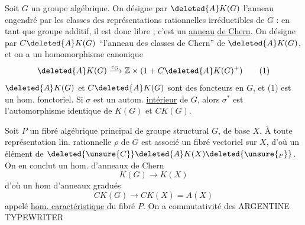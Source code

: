 Soit $G$ un groupe algébrique. On désigne par $\deleted{A}K(G)$
l'anneau  engendré par les classes des représentations
rationnelles irréductibles de $G$ : en tant que groupe
additif, il est donc libre ; c'est un \uline{anneau}
\uline{de Chern}. On désigne par $C\deleted{A}K(G)$ ``l'anneau
des classes de Chern'' de $\deleted{A}K(G)$,  
et on a un homomorphisme canonique
\[
\deleted{A}K(G)\xrightarrow{c_G}\mathbb Z\times(1+C\deleted{A}K(G)^+) \tag*{(1)}
\]
$\deleted{A}K(G)$ et $C\deleted{A}K(G)$ sont des foncteurs en $G$, et
(1) est un hom. fonctoriel. Si $\sigma$ est un
autom. \uline{intérieur} de $G$, alors $\sigma^*$ est l'automorphisme identique de $K(G)$ et $CK(G)$.

Soit $P$ un fibré algébrique principal de
groupe structural $G$, de base $X$. À toute
 représentation lin. rationnelle $\rho$ de $G$
est associé un fibré vectoriel  sur $X$, d'où
un élément de $\deleted{\unsure{C}}\deleted{A}K(X)\deleted{\unsure{{}_P}}$. On en
conclut un hom. d'anneaux de Chern
\[
K(G)\longrightarrow K(X)
\]
d'où un hom d'anneaux gradués
\[
CK(G)\longrightarrow CK(X)=A(X) \tag*{(2)}
\]
appelé \uline{hom. caractéristique} du fibré $P$. On
a commutativité des
  ARGENTINE  TYPEWRITER  
